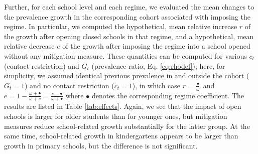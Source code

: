 \documentclass[fleqn,10pt]{wlscirep}
\begin{document}
Further, for each school level and each regime, we evaluated the mean changes to the prevalence growth in the corresponding cohort associated with imposing the regime.
In particular, we computed the hypothetical, mean relative increase $r$ of the growth after opening closed schools in that regime, and a hypothetical, mean relative decrease $e$ of the growth after imposing the regime into a school opened without any mitigation measure. These quantities can be computed for various $c_t$ (contact restriction) and $G_t$ (prevalence ratio, Eq. \ref{eq:rhodef}); here, for simplicity, we assumed identical previous prevalence in and outside the cohort ($G_t=1$) and no contact restriction ($c_t=1$), in which case  $r = \frac{\bullet}\omega$ and $e = 1-\frac{\omega+\bullet}{\omega + \nu} =\frac{\nu-\bullet}{\omega + \bullet}$ where $\bullet$ denotes the corresponding regime coefficient. The results are listed in Table \ref{tab:effects}. Again, we see that the impact of open schools is larger for older students than for younger ones, but mitigation measures reduce school-related growth substantially for the latter group. At the same time, school-related growth in kindergartens appears to be larger than growth in primary schools, but the difference is not significant.
\end{document}
